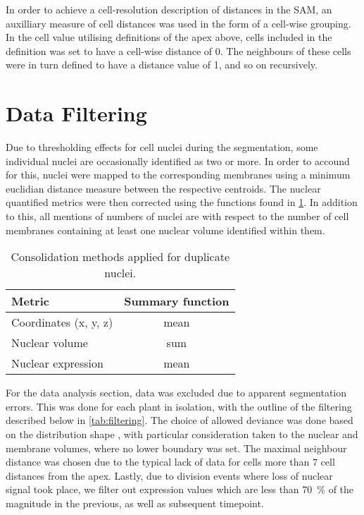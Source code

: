 In order to achieve a cell-resolution description of distances in the SAM,
an auxilliary measure of cell distances was used in the form of a cell-wise
grouping. In the cell value utilising definitions of the apex above, cells
included in the definition was set to have a cell-wise distance of 0. The
neighbours of these cells were in turn defined to have a distance value of 1,
and so on recursively. 

\section[Data Filtering]{Data Filtering}
\label{sec:filtering}
Due to thresholding effects for cell nuclei during the segmentation, some
individual nuclei are
occasionally identified as two or more. In order to accound for this, nuclei
were mapped to the corresponding membranes using a minimum euclidian distance
measure between the respective centroids. The nuclear quantified metrics were
then corrected using the functions found in \cref{tab:consolidation_methods}. In
addition to this, all mentions of numbers of nuclei are with respect to the
number of cell membranes containing at least one nuclear volume identified
within them.

\begin{table}
  \centering
  \caption{Consolidation methods applied for duplicate nuclei.}
  \label{tab:consolidation_methods}
  \begin{tabular}{lc}                                 \\ \toprule
    \textbf{Metric}       & \textbf{Summary function} \\ \midrule
    Coordinates (x, y, z) & mean                      \\
    Nuclear volume        & sum                       \\ 
    Nuclear expression    & mean                      \\ \bottomrule
  \end{tabular}
\end{table}

For the data analysis section, data was excluded due to apparent segmentation
errors. This was done for each plant in isolation, with the outline of the
filtering described below in \cref{tab:filtering}. The choice of allowed
deviance was done based on the distribution shape , with particular consideration
taken to the nuclear and membrane volumes, where no lower boundary was set. The
maximal neighbour distance was chosen due to the typical lack of data for cells more
than $7$ cell distances from the apex. Lastly, due to division events where
loss of nuclear signal took place, we filter out expression values which are
less than 70~\% of the magnitude in the previous, as well as subsequent timepoint.

